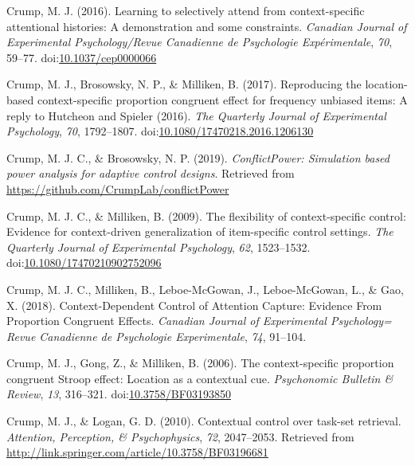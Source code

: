 \documentclass[english,,man,floatsintext]{apa6}
\begin{document}
\leavevmode\hypertarget{ref-crump_learning_2016}{}%
Crump, M. J. (2016). Learning to selectively attend from context-specific attentional histories: A demonstration and some constraints. \emph{Canadian Journal of Experimental Psychology/Revue Canadienne de Psychologie Expérimentale}, \emph{70}, 59--77. doi:\href{https://doi.org/10.1037/cep0000066}{10.1037/cep0000066}

\leavevmode\hypertarget{ref-crump_reproducing_2017}{}%
Crump, M. J., Brosowsky, N. P., \& Milliken, B. (2017). Reproducing the location-based context-specific proportion congruent effect for frequency unbiased items: A reply to Hutcheon and Spieler (2016). \emph{The Quarterly Journal of Experimental Psychology}, \emph{70}, 1792--1807. doi:\href{https://doi.org/10.1080/17470218.2016.1206130}{10.1080/17470218.2016.1206130}

\leavevmode\hypertarget{ref-r_conflictPower_2019}{}%
Crump, M. J. C., \& Brosowsky, N. P. (2019). \emph{ConflictPower: Simulation based power analysis for adaptive control designs}. Retrieved from \url{https://github.com/CrumpLab/conflictPower}

\leavevmode\hypertarget{ref-crump_flexibility_2009}{}%
Crump, M. J. C., \& Milliken, B. (2009). The flexibility of context-specific control: Evidence for context-driven generalization of item-specific control settings. \emph{The Quarterly Journal of Experimental Psychology}, \emph{62}, 1523--1532. doi:\href{https://doi.org/10.1080/17470210902752096}{10.1080/17470210902752096}

\leavevmode\hypertarget{ref-crump_context-dependent_2018}{}%
Crump, M. J. C., Milliken, B., Leboe-McGowan, J., Leboe-McGowan, L., \& Gao, X. (2018). Context-Dependent Control of Attention Capture: Evidence From Proportion Congruent Effects. \emph{Canadian Journal of Experimental Psychology= Revue Canadienne de Psychologie Experimentale}, \emph{74}, 91--104.

\leavevmode\hypertarget{ref-crump_context-specific_2006}{}%
Crump, M. J., Gong, Z., \& Milliken, B. (2006). The context-specific proportion congruent Stroop effect: Location as a contextual cue. \emph{Psychonomic Bulletin \& Review}, \emph{13}, 316--321. doi:\href{https://doi.org/10.3758/BF03193850}{10.3758/BF03193850}

\leavevmode\hypertarget{ref-crump_contextual_2010}{}%
Crump, M. J., \& Logan, G. D. (2010). Contextual control over task-set retrieval. \emph{Attention, Perception, \& Psychophysics}, \emph{72}, 2047--2053. Retrieved from \url{http://link.springer.com/article/10.3758/BF03196681}
\end{document}
